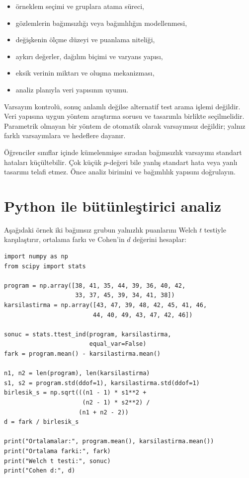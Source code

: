 \begin{itemize}
  \item örneklem seçimi ve gruplara atama süreci,
  \item gözlemlerin bağımsızlığı veya bağımlılığın modellenmesi,
  \item değişkenin ölçme düzeyi ve puanlama niteliği,
  \item aykırı değerler, dağılım biçimi ve varyans yapısı,
  \item eksik verinin miktarı ve oluşma mekanizması,
  \item analiz planıyla veri yapısının uyumu.
\end{itemize}

Varsayım kontrolü, sonuç anlamlı değilse alternatif test arama işlemi
değildir. Veri yapısına uygun yöntem araştırma sorusu ve tasarımla birlikte
seçilmelidir. Parametrik olmayan bir yöntem de otomatik olarak varsayımsız
değildir; yalnız farklı varsayımlara ve hedeflere dayanır.

\begin{assumptionbox}
Öğrenciler sınıflar içinde kümelenmişse sıradan bağımsızlık varsayımı standart
hataları küçültebilir. Çok küçük $p$-değeri bile yanlış standart hata veya
yanlı tasarımı telafi etmez. Önce analiz birimini ve bağımlılık yapısını
doğrulayın.
\end{assumptionbox}

\section{Python ile bütünleştirici analiz}

Aşağıdaki örnek iki bağımsız grubun yalnızlık puanlarını Welch $t$ testiyle
karşılaştırır, ortalama farkı ve Cohen'in $d$ değerini hesaplar:

\begin{lstlisting}
import numpy as np
from scipy import stats

program = np.array([38, 41, 35, 44, 39, 36, 40, 42,
                    33, 37, 45, 39, 34, 41, 38])
karsilastirma = np.array([43, 47, 39, 48, 42, 45, 41, 46,
                         44, 40, 49, 43, 47, 42, 46])

sonuc = stats.ttest_ind(program, karsilastirma,
                        equal_var=False)
fark = program.mean() - karsilastirma.mean()

n1, n2 = len(program), len(karsilastirma)
s1, s2 = program.std(ddof=1), karsilastirma.std(ddof=1)
birlesik_s = np.sqrt(((n1 - 1) * s1**2 +
                      (n2 - 1) * s2**2) /
                     (n1 + n2 - 2))
d = fark / birlesik_s

print("Ortalamalar:", program.mean(), karsilastirma.mean())
print("Ortalama farki:", fark)
print("Welch t testi:", sonuc)
print("Cohen d:", d)
\end{lstlisting}

